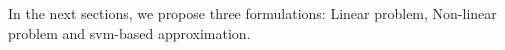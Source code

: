 %

In the next sections, we propose three formulations: Linear problem, Non-linear problem and {\sc svm}-based approximation.





